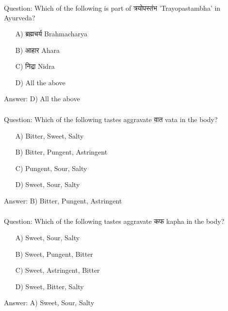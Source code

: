 \begin{frame}[fragile]\frametitle{}

Question: Which of the following is part of त्रयोपस्तंभ 'Trayopastambha' in Ayurveda?

\begin{itemize}
\item[A)] ब्रह्मचर्य Brahmacharya
\item[B)] आहार Ahara
\item[C)] निद्रा Nidra
\item[D)] All the above
\end{itemize}

Answer: D) All the above
\end{frame}

\begin{frame}[fragile]\frametitle{}

Question: Which of the following tastes aggravate वात  vata in the body?

\begin{itemize}
\item[A)] Bitter, Sweet, Salty
\item[B)] Bitter, Pungent, Astringent
\item[C)] Pungent, Sour, Salty
\item[D)] Sweet, Sour, Salty
\end{itemize}

Answer: B) Bitter, Pungent, Astringent
\end{frame}

\begin{frame}[fragile]\frametitle{}

Question: Which of the following tastes aggravate कफ  kapha in the body?

\begin{itemize}
\item[A)] Sweet, Sour, Salty
\item[B)] Sweet, Pungent, Bitter
\item[C)] Sweet, Astringent, Bitter
\item[D)] Sweet, Bitter, Salty
\end{itemize}

Answer: A) Sweet, Sour, Salty
\end{frame}

